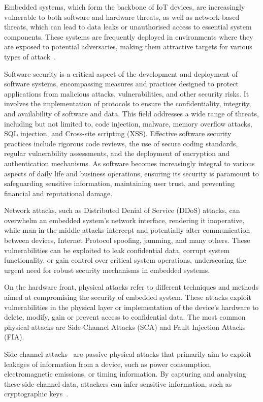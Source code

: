 Embedded systems, which form the backbone of IoT devices, are increasingly vulnerable to both software and hardware threats, as well as network-based threats, which can lead to data leaks or unauthorised access to essential system components. These systems are frequently deployed in environments where they are exposed to potential adversaries, making them attractive targets for various types of attack~\cite{MW-19-compnet, EAJJMB-22-compscrev}.

Software security is a critical aspect of the development and deployment of software systems, encompassing measures and practices designed to protect applications from malicious attacks, vulnerabilities, and other security risks. It involves the implementation of protocols to ensure the confidentiality, integrity, and availability of software and data. This field addresses a wide range of threats, including but not limited to, code injection, malware, memory overflow attacks, SQL injection, and Cross-site scripting (XSS). Effective software security practices include rigorous code reviews, the use of secure coding standards, regular vulnerability assessments, and the deployment of encryption and authentication mechanisms. As software becomes increasingly integral to various aspects of daily life and business operations, ensuring its security is paramount to safeguarding sensitive information, maintaining user trust, and preventing financial and reputational damage.

Network attacks, such as Distributed Denial of Service (DDoS) attacks, can overwhelm an embedded system's network interface, rendering it inoperative, while man-in-the-middle attacks intercept and potentially alter communication between devices, Internet Protocol spoofing, jamming, and many others. These vulnerabilities can be exploited to leak confidential data, corrupt system functionality, or gain control over critical system operations, underscoring the urgent need for robust security mechanisms in embedded systems.

On the hardware front, physical attacks refer to different techniques and methods aimed at compromising the security of embedded system. These attacks exploit vulnerabilities in the physical layer or implementation of the device’s hardware to delete, modify, gain or prevent access to confidential data.
The most common physical attacks are Side-Channel Attacks (SCA) and Fault Injection Attacks (FIA).

Side-channel attacks~\cite{DM-21-appiot} are passive physical attacks that primarily aim to exploit leakages of information from a device, such as power consumption, electromagnetic emissions, or timing information. By capturing and analysing these side-channel data, attackers can infer sensitive information, such as cryptographic keys~\cite{K-96-crypto}.

